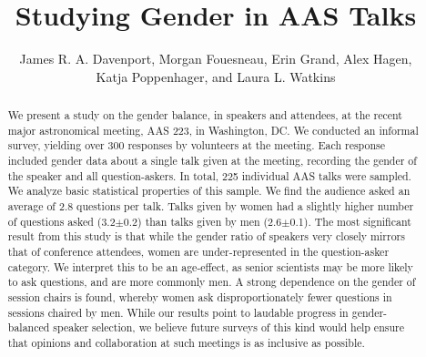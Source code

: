 \documentclass[iop]{emulateapj}
\begin{document}
\title{Studying Gender in AAS Talks}
\author{
	James R. A. Davenport,
	Morgan Fouesneau,
	Erin Grand,
	Alex Hagen,\\
	Katja Poppenhager,
	and Laura L. Watkins
	}





\begin{abstract}
We present a study on the gender balance, in speakers and attendees, at the recent major astronomical meeting, AAS 223, in Washington, DC. We conducted an informal survey, yielding over 300 responses by volunteers at the meeting. Each response included gender data about a single talk given at the meeting, recording the gender of the speaker and all question-askers. In total, 225 individual AAS talks were sampled. We analyze basic statistical properties of this sample. We find the audience asked an average of 2.8 questions per talk. Talks given by women had a slightly higher number of questions asked (3.2$\pm$0.2) than talks given by men (2.6$\pm$0.1).
 The most significant result from this study is that while the gender ratio of speakers very closely mirrors that of conference attendees, women are under-represented in the question-asker category.  We interpret this to be an age-effect, as senior scientists may be more likely to ask questions, and are more commonly men. A strong dependence on the gender of session chairs is found, whereby women ask disproportionately fewer questions in sessions chaired by men. While our results point to laudable progress in gender-balanced speaker selection, we believe future surveys of this kind would help ensure that opinions and collaboration at such meetings is as inclusive as possible.
\end{abstract}


\end{document}
